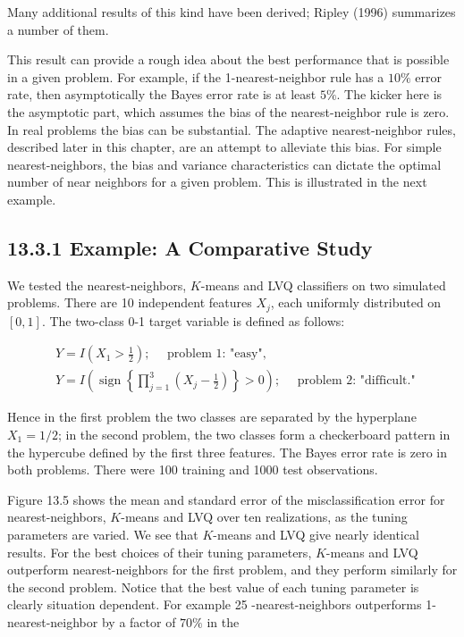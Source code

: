 \documentclass[10pt]{article}
\begin{document}
Many additional results of this kind have been derived; Ripley (1996) summarizes a number of them.

This result can provide a rough idea about the best performance that is possible in a given problem. For example, if the 1-nearest-neighbor rule has a $10 \%$ error rate, then asymptotically the Bayes error rate is at least $5 \%$. The kicker here is the asymptotic part, which assumes the bias of the nearest-neighbor rule is zero. In real problems the bias can be substantial. The adaptive nearest-neighbor rules, described later in this chapter, are an attempt to alleviate this bias. For simple nearest-neighbors, the bias and variance characteristics can dictate the optimal number of near neighbors for a given problem. This is illustrated in the next example.

\subsection*{13.3.1 Example: A Comparative Study}
We tested the nearest-neighbors, $K$-means and LVQ classifiers on two simulated problems. There are 10 independent features $X_{j}$, each uniformly distributed on $[0,1]$. The two-class 0-1 target variable is defined as follows:


\begin{align*}
& Y=I\left(X_{1}>\frac{1}{2}\right) ; \quad \text { problem 1: "easy", } \\
& Y=I\left(\operatorname{sign}\left\{\prod_{j=1}^{3}\left(X_{j}-\frac{1}{2}\right)\right\}>0\right) ; \quad \text { problem 2: "difficult." } \tag{13.6}
\end{align*}


Hence in the first problem the two classes are separated by the hyperplane $X_{1}=1 / 2$; in the second problem, the two classes form a checkerboard pattern in the hypercube defined by the first three features. The Bayes error rate is zero in both problems. There were 100 training and 1000 test observations.

Figure 13.5 shows the mean and standard error of the misclassification error for nearest-neighbors, $K$-means and LVQ over ten realizations, as the tuning parameters are varied. We see that $K$-means and LVQ give nearly identical results. For the best choices of their tuning parameters, $K$-means and LVQ outperform nearest-neighbors for the first problem, and they perform similarly for the second problem. Notice that the best value of each tuning parameter is clearly situation dependent. For example 25 -nearest-neighbors outperforms 1-nearest-neighbor by a factor of $70 \%$ in the
\end{document}
